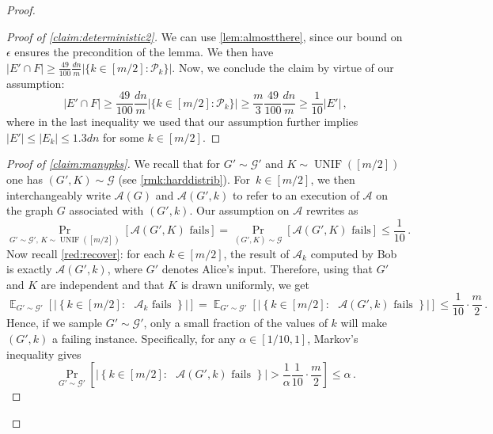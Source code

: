 \documentclass[epsfig,letter,11pt]{article}
\numberwithin{equation}{section}
\DeclareMathOperator{\ex}{\mathbb{E}}
\DeclareMathOperator{\unif}{UNIF}
\begin{document}
\begin{proof}
		\begin{proof}[Proof of \cref{claim:deterministic2}]
		We can use \cref{lem:almostthere}, since our bound on $\epsilon$ ensures the precondition of the lemma. We then have $|E' \cap F|  \ge \frac{49}{100} \frac{dn}{m}  |\{k\in [m/2] : \mathcal{P}_k\}| $.  Now, we conclude the claim by virtue of our assumption:
		\begin{equation*}
			|E' \cap F| \ge \frac{49}{100} \frac{dn}{m}  |\{k\in [m/2] : \mathcal{P}_k\}|  \ge \frac{m}{3} \frac{49}{100} \frac{dn}{m} \ge \frac{1}{10} |E'| \, ,
		\end{equation*}
		where in the last inequality we used that our assumption further implies $|E'| \le |E_k| \le 1.3dn$ for some $k \in [m/2]$.
	\end{proof}
	
	
	\begin{proof}[Proof of \cref{claim:manypks}]
		We recall that for $G' \sim \mathcal{G}'$ and $K \sim \unif([m/2])$ one has $(G',K) \sim \mathcal{G}$ (see \cref{rmk:harddistrib}). For~$k \in [m/2]$, we then interchangeably write $\mathcal{A}(G)$ and $\mathcal{A}(G',k)$ to refer to an execution of $\mathcal{A}$ on the graph $G$ associated with $(G',k)$. Our assumption on $\mathcal{A}$ rewrites as
		\begin{equation*}
			\Pr_{G' \sim \mathcal{G}', \, K \sim \unif([m/2])}\left[\text{$\mathcal{A}(G',K)$ fails}\right]  = \Pr_{(G',K) \sim \mathcal{G}}\left[\text{$\mathcal{A}(G',K)$ fails}\right] \le \frac{1}{10} \, .
		\end{equation*}
		Now recall \cref{red:recover}: for each $k \in [m/2]$, the result of $\mathcal{A}_k$ computed by Bob is exactly $\mathcal{A}(G',k)$, where $G'$ denotes Alice's input. Therefore, using that $G'$ and $K$ are independent and that $K$ is drawn uniformly, we get
		\begin{equation*}
			\ex_{G' \sim \mathcal{G}'} \left[ \left| \left\{k \in [m/2] : \text{ $\mathcal{A}_k$ fails }\right\}\right| \right] =\ex_{G' \sim \mathcal{G}'} \left[ \left| \left\{k \in [m/2] : \text{ $\mathcal{A}(G',k)$ fails }\right\}\right| \right] \le \frac{1}{10} \cdot \frac{m}{2} \, .
		\end{equation*}
		Hence, if we sample $G' \sim \mathcal{G}'$, only a small fraction of the values of $k$ will make $(G',k)$ a failing instance. Specifically, for any $\alpha \in [1/10, 1]$, Markov's inequality gives
		\begin{equation*}
			\Pr_{G' \sim \mathcal{G}'}\left[\left| \left\{k \in [m/2] : \text{ $\mathcal{A}(G',k)$ fails }\right\}\right| > \frac{1}{\alpha}  \frac{1}{10} \cdot\frac{m}{2}\right] \le \alpha\, .

\end{equation*}
\end{proof}
\end{proof}
\end{document}
